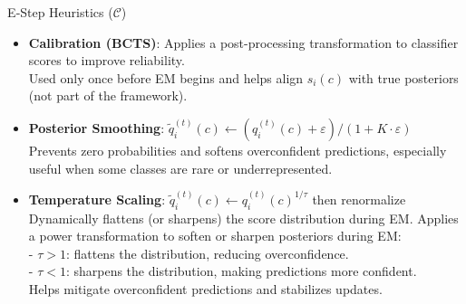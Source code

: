 \documentclass[aspectratio=169]{beamer}
\begin{document}
\begin{frame}{E‑Step Heuristics ($\mathcal{C}$)}
  \begin{itemize}
    \item \textbf{Calibration (BCTS)}: Applies a post-processing transformation to classifier scores to improve reliability.\\
    \small Used only once before EM begins and helps align $s_i(c)$ with true posteriors (not part of the framework).
    \normalsize

    \item \textbf{Posterior Smoothing}: $\tilde{q}_i^{(t)}(c)\! \leftarrow\! ({q}_i^{(t)}(c)+\varepsilon)/(1+K\cdot\varepsilon)$\\
    \small Prevents zero probabilities and softens overconfident predictions, especially useful when some classes are rare or underrepresented.
    \normalsize

    \item \textbf{Temperature Scaling}: $\tilde{q}_i^{(t)}(c) \leftarrow q_i^{(t)}(c)^{1/\tau}$ then renormalize\\
    \small Dynamically flattens (or sharpens) the score distribution during EM. 
    \small Applies a power transformation to soften or sharpen posteriors during EM:\\
    - \( \tau > 1 \): flattens the distribution, reducing overconfidence.\\
    - \( \tau < 1 \): sharpens the distribution, making predictions more confident.\\Helps mitigate overconfident predictions and stabilizes updates.
  \end{itemize}
\end{frame}
\end{document}
